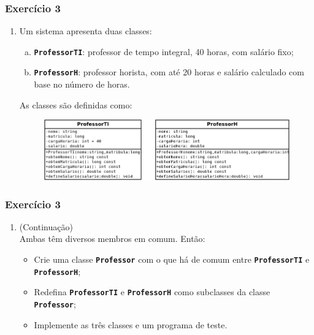 \documentclass[aspectratio=169]{beamer}
\newcommand\setItemnumber[1]{\setcounter{enumi}{\numexpr#1-1\relax}}
\begin{document}
\begin{frame}[fragile]\frametitle{Exercício 3}
\begin{enumerate}
	\setItemnumber{3}
	\item Um sistema apresenta duas classes:
	\begin{enumerate}[a.]
		\item \texttt{\textbf{ProfessorTI}}: professor de tempo integral, 40 horas, com salário fixo;
		\item \texttt{\textbf{ProfessorH}}: professor horista, com até 20 horas e salário calculado com base no número de horas.
	\end{enumerate}
	As classes são definidas como:
\begin{figure}[h]
	\includegraphics[height=0.35\paperheight]{pucrs-ec-poo-unidade_13-heranca-laminas-exercicio_professor.png}
\end{figure}
\end{enumerate}
\end{frame}

\begin{frame}[fragile]\frametitle{Exercício 3}
\begin{enumerate}
	\setItemnumber{3}
	\item (Continuação)\\
	Ambas têm diversos membros em comum. Então:
	\begin{itemize}
		\item Crie uma classe \texttt{\textbf{Professor}} com o que há de comum entre \texttt{\textbf{ProfessorTI}} e \texttt{\textbf{ProfessorH}};
		\item Redefina \texttt{\textbf{ProfessorTI}} e \texttt{\textbf{ProfessorH}} como subclasses da classe \texttt{\textbf{Professor}};
		\item Implemente as três classes e um programa de teste.
	\end{itemize}
\end{enumerate}
\end{frame}

\end{document}
